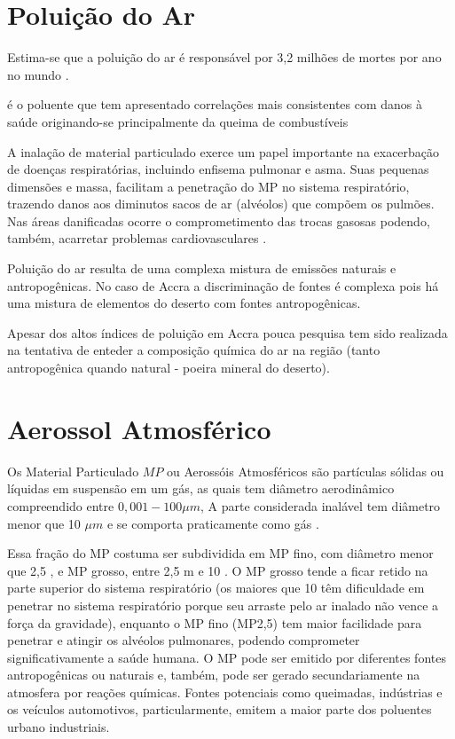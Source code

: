 
\section{Poluição do Ar}

Estima-se que a poluição do ar é responsável por 
3,2 milhões de mortes por ano no mundo \cite{lim2013}. 

é o poluente que tem apresentado correlações mais consistentes com
 danos à saúde originando-se principalmente da queima de combustíveis

A inalação de material particulado exerce um papel importante na 
exacerbação de doenças respiratórias, incluindo enfisema pulmonar e asma. 
Suas pequenas dimensões e massa, facilitam a penetração do MP no sistema 
respiratório, trazendo danos aos diminutos sacos de ar (alvéolos) que 
compõem os pulmões. Nas áreas danificadas ocorre o comprometimento das 
trocas gasosas podendo, também, acarretar problemas cardiovasculares
\cite{arbex2012}.

Poluição do ar resulta de uma complexa mistura de emissões naturais e 
antropogênicas. No caso de Accra a discriminação de fontes é complexa pois
há uma mistura de elementos do deserto com fontes antropogênicas.

Apesar dos altos índices de poluição em Accra pouca pesquisa tem sido 
realizada na tentativa de enteder a composição química do ar na região
(tanto antropogênica quando natural - poeira mineral do deserto). 






\section{Aerossol Atmosférico}

Os Material Particulado $MP$ ou  Aerossóis Atmosféricos são partículas
sólidas ou líquidas em suspensão em um gás, as quais tem diâmetro 
aerodinâmico compreendido  entre $0,001-100\mu m$, 
A parte considerada inalável tem diâmetro menor que 10 $\mu m$
e se comporta praticamente como gás \cite{seinfeld1998}.

Essa fração do MP costuma ser subdividida em MP fino, com diâmetro menor que 2,5 , e MP grosso, entre  2,5 m e 10 . O MP grosso tende a ficar retido na parte superior do sistema respiratório (os maiores que 10 têm dificuldade em penetrar no sistema respiratório porque seu arraste pelo ar inalado não vence a força da gravidade), enquanto o MP fino (MP2,5) tem maior facilidade para penetrar e atingir os alvéolos pulmonares, podendo comprometer significativamente a saúde humana. O MP pode ser emitido por diferentes fontes antropogênicas ou naturais e, também, pode ser gerado secundariamente na atmosfera por reações químicas. Fontes potenciais como queimadas,  indústrias e os veículos automotivos, particularmente, emitem a maior parte dos poluentes urbano industriais.
 	


